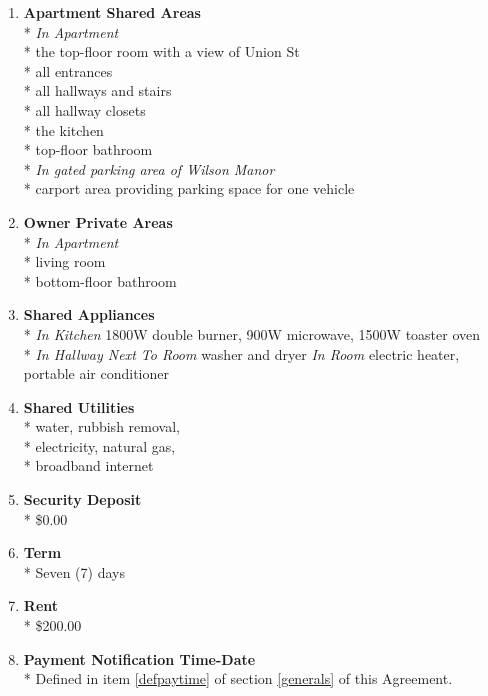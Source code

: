 \documentclass[12pt,letterpaper]{article}
\newcommand{\condo}{Wilson Manor}
\newcommand{\apt}{Apartment}
\newcommand{\room}{Room}
\newcommand{\shared}{Apartment Shared Areas}
\newcommand{\livingroom}{Owner Private Areas}
\newcommand{\appliances}{Shared Appliances}
\newcommand{\utilities}{Shared Utilities}
\newcommand{\deposit}{Security Deposit}
\newcommand{\paymenttime}{Payment Notification Time-Date}
\begin{document}
\begin{multicols}{2}
\begin{enumerate}
			\item \textbf{\shared{}}\\* \label{shared}
				\textit{In \apt{}}\\*
				the top-floor room with a view of Union St\\*
				all entrances\\*
				all hallways and stairs\\*
				all hallway closets\\*
				the kitchen\\*
				top-floor bathroom\\*
				\textit{In gated parking area of \condo{}}\\*
				carport area providing parking space for one vehicle
				
			\item \textbf{\livingroom{}}\\* \label{livingroom}
				\textit{In \apt{}}\\*
				living room\\*
				bottom-floor bathroom
				
			\item \textbf{\appliances}\\* \label{appliances}
				\textit{In Kitchen} 1800W double burner,
				900W microwave,
				1500W toaster oven\\*
				\textit{In Hallway Next To \room{}} washer and dryer
				\textit{In \room{}} electric heater,
				portable air conditioner
				
			\item \textbf{\utilities{}}\\* \label{utilities}
				water,
				rubbish removal,\\*
				electricity,
				natural gas,\\*
				broadband internet

			\item \textbf{\deposit{}}\\* \label{deposit}
				\$0.00

			\item \textbf{Term}\\*
				Seven (7) days

			\item \textbf{Rent}\\* \label{rent}
				\$200.00

			\item \textbf{\paymenttime{}}\\* \label{paymenttime}
				Defined in item \ref{defpaytime} of section \ref{generals} of this Agreement.


\end{enumerate}
\end{multicols}
\end{document}

